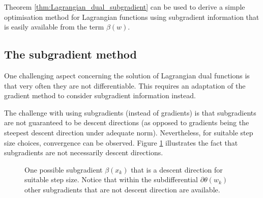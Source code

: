 Theorem \ref{thm:Lagrangian_dual_subgradient} can be used to derive a simple optimisation method for Lagrangian functions using subgradient information that is easily available from the term $\beta(w)$.


\subsection{The subgradient method}


One challenging aspect concerning the solution of Lagrangian dual functions is that very often they are not differentiable. This requires an adaptation of the gradient method to consider subgradient information instead.

The challenge with using subgradients (instead of gradients) is that subgradients are not guaranteed to be descent directions (as opposed to gradients being the steepest descent direction under adequate norm). Nevertheless, for suitable step size choices, convergence can be observed. Figure \ref{fig:subgradients} illustrates the fact that subgradients are not necessarily descent directions.

\begin{figure}[h]
	\caption{One possible subgradient $\beta(x_k)$ that is a descent direction for suitable step size. Notice that within the subdifferential $\partial \theta(w_k)$ other subgradients that are not descent direction are available.} \label{fig:subgradients}	
\end{figure}




